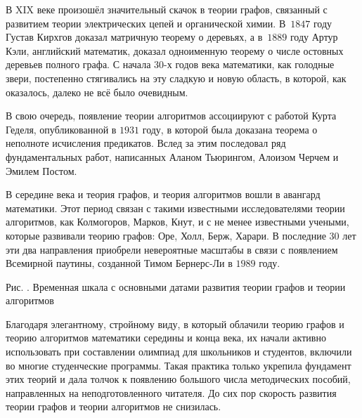 	В XIX веке произошёл значительный скачок в теории графов, связанный с развитием теории электрических цепей и органической химии. 
	В~$1847$ году Густав Кирхгов доказал матричную теорему о деревьях, а в~$1889$ году Артур Кэли, английский математик, доказал одноименную
	теорему о числе остовных деревьев полного графа. С начала $30$-х годов  века математики, как голодные звери, постепенно стягивались 
	на эту сладкую и новую область, в которой, как оказалось, далеко не всё было очевидным.
	
	В свою очередь, появление теории алгоритмов ассоциируют с работой Курта Геделя, опубликованной в $1931$ году, в которой была доказана теорема 
	о неполноте исчисления предикатов. Вслед за этим последовал ряд фундаментальных работ, написанных Аланом Тьюрингом, Алоизом Черчем и Эмилем Постом.
		
	В середине  века и теория графов, и теория алгоритмов вошли в авангард математики. Этот период связан с такими 
	известными исследователями теории алгоритмов, как Колмогоров, Марков, Кнут, и с не менее известными учеными, которые развивали
	теорию графов: Оре, Холл, Берж, Харари. В последние $30$ лет эти два направления приобрели невероятные масштабы в связи с 
	появлением Всемирной паутины, созданной Тимом Бернерс-Ли в $1989$ году.

\begin{center}

	\small Рис. \images. Временная шкала с основными датами развития теории графов и теории алгоритмов
\end{center}

	Благодаря элегантному, стройному виду, в который облачили теорию графов и теорию алгоритмов математики середины и конца  века,
	их начали активно использовать при составлении олимпиад для школьников и студентов, включили во многие студенческие программы. Такая 
	практика только укрепила фундамент этих теорий и дала толчок к появлению большого числа методических пособий, направленных на 
	неподготовленного читателя. До сих пор скорость развития теории графов и теории алгоритмов не снизилась.
	
